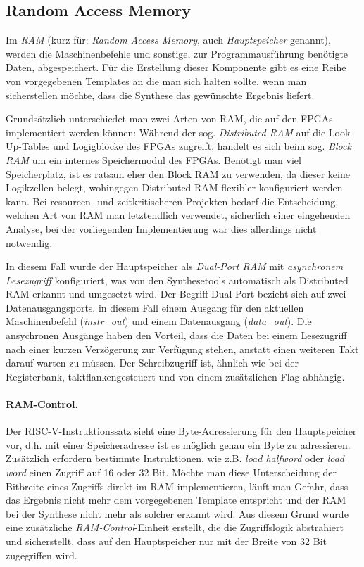 \subsection{Random Access Memory}

Im \textit{RAM} (kurz für: \textit{Random Access Memory}, auch \textit{Hauptspeicher} genannt), werden die Maschinenbefehle und sonstige, zur Programmausführung benötigte Daten, abgespeichert.
Für die Erstellung dieser Komponente gibt es eine Reihe von vorgegebenen Templates an die man sich halten sollte, wenn man sicherstellen möchte, dass die Synthese das gewünschte Ergebnis liefert.~\cite[S. 243 ff.]{Chu}

Grundsätzlich unterschiedet man zwei Arten von RAM, die auf den FPGAs implementiert werden können:
Während der sog. \textit{Distributed RAM} auf die Look-Up-Tables und Logigblöcke des FPGAs zugreift, handelt es sich beim sog. \textit{Block RAM} um ein internes Speichermodul des FPGAs.
Benötigt man viel Speicherplatz, ist es ratsam eher den Block RAM zu verwenden, da dieser keine Logikzellen belegt, wohingegen Distributed RAM flexibler konfiguriert werden kann.
Bei resourcen- und zeitkritischeren Projekten bedarf die Entscheidung, welchen Art von RAM man letztendlich verwendet, sicherlich einer eingehenden Analyse, bei der vorliegenden Implementierung war dies allerdings nicht notwendig.


In diesem Fall wurde der Hauptspeicher als \textit{Dual-Port RAM} mit \textit{asynchronem Lesezugriff} konfiguriert, was von den Synthesetools automatisch als Distributed RAM erkannt und umgesetzt wird.
Der Begriff Dual-Port bezieht sich auf zwei Datenausgangsports, in diesem Fall einem Ausgang für den aktuellen Maschinenbefehl (\textit{instr\_out}) und einem Datenausgang (\textit{data\_out}).
Die ansychronen Ausgänge haben den Vorteil, dass die Daten bei einem Lesezugriff nach einer kurzen Verzögerung zur Verfügung stehen, anstatt einen weiteren Takt darauf warten zu müssen.
Der Schreibzugriff ist, ähnlich wie bei der Registerbank, taktflankengesteuert und von einem zusätzlichen Flag abhängig.

\paragraph{RAM-Control.} Der RISC-V-Instruktionssatz sieht eine Byte-Adressierung für den Hauptspeicher vor, d.h. mit einer Speicheradresse ist es möglich genau ein Byte zu adressieren.
Zusätzlich erfordern bestimmte Instruktionen, wie z.B. \textit{load halfword} oder \textit{load word} einen Zugriff auf 16 oder 32 Bit.
Möchte man diese Unterscheidung der Bitbreite eines Zugriffs direkt im RAM implementieren, läuft man Gefahr, dass das Ergebnis nicht mehr dem vorgegebenen Template entspricht und der RAM bei der Synthese nicht mehr als solcher erkannt wird.
Aus diesem Grund wurde eine zusätzliche \textit{RAM-Control}-Einheit erstellt, die die Zugriffslogik abstrahiert und sicherstellt, dass auf den Hauptspeicher nur mit der Breite von 32 Bit zugegriffen wird.

